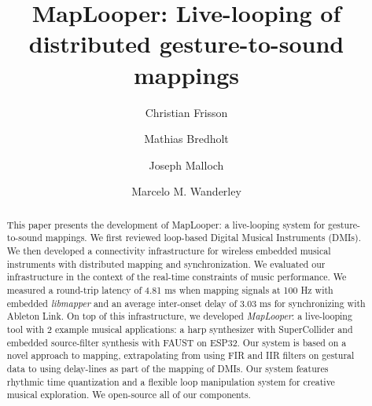 \documentclass[sigconf]{nimeart}
\begin{document}
\title[MapLooper: Live-looping of distributed gesture-to-sound mappings]{MapLooper: Live-looping of distributed gesture-to-sound mappings}
\author{Christian Frisson}
\author{Mathias Bredholt}
\author{Joseph Malloch}
\author{Marcelo M. Wanderley}
\renewcommand{\shortauthors}{Frisson et al.}
\begin{abstract}
This paper presents the development of MapLooper: a live-looping system for gesture-to-sound mappings. We first reviewed loop-based Digital Musical Instruments (DMIs). We then developed a connectivity infrastructure for wireless embedded musical instruments with distributed mapping and synchronization. We evaluated our infrastructure in the context of the real-time constraints of music performance. We measured a round-trip latency of 4.81 ms when mapping signals at 100 Hz with embedded \emph{libmapper} and an average inter-onset delay of 3.03 ms for synchronizing with Ableton Link. On top of this infrastructure, we developed \emph{MapLooper}: a live-looping tool with 2 example musical applications: a harp synthesizer with SuperCollider and embedded source-filter synthesis with FAUST on ESP32. Our system is based on a novel approach to mapping, extrapolating from using FIR and IIR filters on gestural data to using delay-lines as part of the mapping of DMIs. Our system features rhythmic time quantization and a flexible loop manipulation system for creative musical exploration. We open-source all of our components.
\end{abstract}

\maketitle
\end{document}
